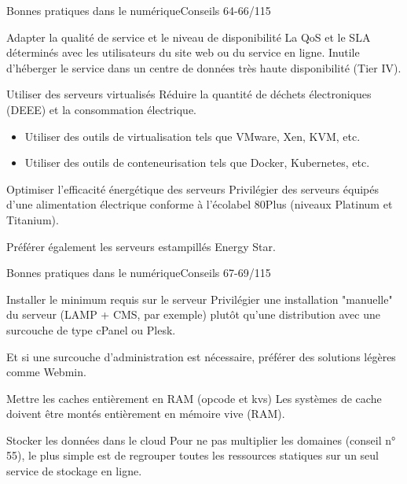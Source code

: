 \begin{frame}{Bonnes pratiques dans le numérique}{Conseils 64-66/115}
\begin{block}{Adapter la qualité de service et le niveau de disponibilité}
La QoS et le SLA déterminés avec les utilisateurs du site web ou du service en ligne. Inutile d’héberger le service dans un centre de données très haute disponibilité (Tier IV).
\end{block}

\begin{block}{Utiliser des serveurs virtualisés}
Réduire la quantité de déchets électroniques (DEEE) et la consommation électrique.
\begin{itemize}
    \item Utiliser des outils de virtualisation tels que VMware, Xen, KVM, etc.
    \item Utiliser des outils de conteneurisation tels que Docker, Kubernetes, etc.
\end{itemize}
\end{block}

\begin{block}{Optimiser l'efficacité énergétique des serveurs} 
Privilégier des serveurs équipés d’une alimentation électrique conforme à l’écolabel 80Plus (niveaux Platinum et Titanium).

Préférer également les serveurs estampillés Energy Star.
\end{block}

\end{frame}



\begin{frame}{Bonnes pratiques dans le numérique}{Conseils 67-69/115}
\begin{block}{Installer le minimum requis sur le serveur}
Privilégier une installation "manuelle" du serveur (LAMP + CMS, par exemple) plutôt qu’une distribution avec une surcouche de type cPanel ou Plesk.

Et si une surcouche d’administration est nécessaire, préférer des solutions légères comme Webmin.
\end{block}

\begin{block}{Mettre les caches entièrement en RAM (opcode et kvs)}
Les systèmes de cache doivent être montés entièrement en mémoire vive (RAM). 
\end{block}

\begin{block}{Stocker les données dans le cloud}
Pour ne pas multiplier les domaines (conseil n° 55), le plus simple est de regrouper toutes les ressources statiques sur un seul service de stockage en ligne.
\end{block}



\end{frame}


